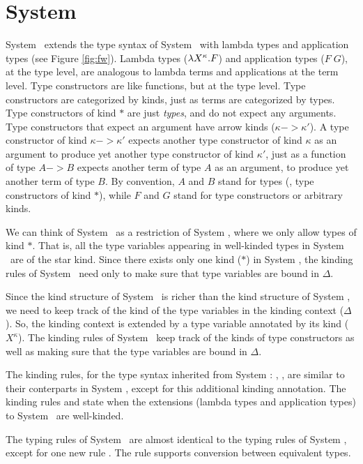 \section{System \Fw} \label{sec:fw}
System \Fw\ extends the type syntax of System \F\ with lambda types and
application types (see Figure \ref{fig:fw}). Lambda types ($\lambda X^\kappa.F$)
and application types ($F\;G$), at the type level, are analogous to lambda terms
and applications at the term level. Type constructors are like functions, but
at the type level. Type constructors are categorized by kinds, just as terms
are categorized by types. Type constructors of kind $*$ are just
\emph{types}, and do not expect any arguments. Type constructors that expect
an argument have arrow kinds ($\kappa -> \kappa'$). 
A type constructor of kind $\kappa -> \kappa'$
expects another type constructor of kind $\kappa$ as an argument to produce
yet another type constructor of kind $\kappa'$, just as a function of type
$A -> B$ expects another term of type $A$ as an argument, to produce yet another
term of type $B$.   By convention,
$A$ and $B$ stand for types (\ie, type constructors of kind $*$),
while $F$ and $G$ stand for type constructors or arbitrary kinds.

We can think of System \F\ as a restriction of System \Fw, where we only
allow types of kind $*$. That is, all the type variables appearing in
well-kinded types in System \F\ are of the star kind. Since there exists only
one kind ($*$) in System \F, the kinding rules of System \F\ need only to make
sure that type variables are bound in $\Delta$.

Since the kind structure of System \Fw\ is richer than the kind structure of System \F, we need to
keep track of the kind of the type variables in the kinding context ($\Delta$).
So, the kinding context is extended by a type variable annotated by its kind
($X^\kappa$). The kinding rules of System \Fw\ keep track of the kinds of
type constructors as well as making sure that the type variables are bound in $\Delta$.

The kinding rules, for the type syntax inherited from System \F:
, , 
are similar to their conterparts in System \F, except for this additional
kinding annotation. The kinding rules 
 and  state when the extensions (lambda types and
application types) to System \F\ are well-kinded.

The typing rules of System \Fw\ are almost identical to the typing rules of
System \F, except for one new rule . The  rule
supports conversion between equivalent types.

